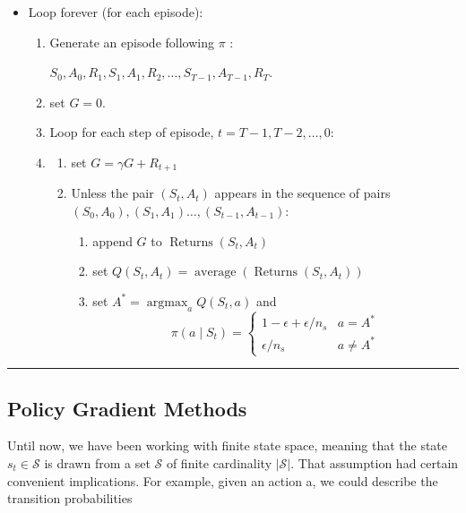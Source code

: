 \documentclass[11pt]{article}
\theoremstyle{plain} %
\theoremstyle{remark}
\begin{document}
          \begin{itemize}
            \item Loop forever (for each episode):
            \begin{enumerate}[label=(\arabic*)]
              \item Generate an episode following $\pi$ :

              $S_{0}, A_{0}, R_{1}, S_{1}, A_{1}, R_{2}, \ldots, S_{T-1}, A_{T-1}, R_{T}$.
              \item set $G=0$.
              \item Loop for each step of episode, $t=T-1, T-2, \ldots, 0$:
              \item \begin{enumerate}[label=(\arabic*)]
                \item set $G=\gamma G+R_{t+1}$
                \item Unless the pair $\left(S_{t}, A_{t}\right)$ appears in the sequence of
                pairs $\left(S_{0}, A_{0}\right),\left(S_{1}, A_{1}\right)\ldots,\left(S_{t-1}, A_{t-1}\right)$:
                \begin{enumerate}[label=(\arabic*)]
                  \item append $G$ to $\operatorname{Returns}\left(S_{t}, A_{t}\right)$
                  \item set $Q\left(S_{t}, A_{t}\right)=\operatorname{average}\left(\operatorname{Returns}\left(S_{t}, A_{t}\right)\right)$
                  \item set $A^{*}=\operatorname{argmax}_{a} Q\left(S_{t}, a\right)$ and
                  $$
                  \pi\left(a \mid S_{t}\right)= \begin{cases}1-\epsilon+\epsilon / n_{s} & a=A^{*} \\ \epsilon / n_{s} & a \neq A^{*}\end{cases}
                  $$
                \end{enumerate}
              \end{enumerate}
            \end{enumerate}
          \end{itemize}

\vspace*{0.65em}
\hrule

\subsection{Policy Gradient Methods }
 Until now, we have been working with finite state space, meaning that
  the state $s_{t} \in \mathcal{S}$ is drawn from a set $\mathcal{S}$ of finite
  cardinality $|\mathcal{S}|$. That assumption had certain convenient implications. For example, given an action a, we could describe the transition
  probabilities
\end{document}
